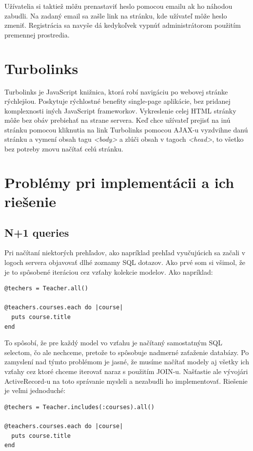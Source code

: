 Užívatelia si taktiež môžu prenastaviť heslo pomocou emailu ak ho náhodou zabudli. Na zadaný email sa zašle link na stránku, kde užívateľ môže heslo zmeniť. Registrácia sa navyše dá kedykoľvek vypnúť administrátorom použitím premennej prostredia.

\clearpage
\section{Turbolinks}

Turbolinks je JavaScript knižnica, ktorá robí navigáciu po webovej stránke rýchlejšou. Poskytuje rýchlostné benefity single-page aplikácie, bez pridanej komplexnosti iných JavaScript frameworkov. Vykreslenie celej HTML stránky môže bez obáv prebiehať na strane servera. Keď chce užívateľ prejisť na inú stránku pomocou kliknutia na link Turbolinks pomocou AJAX-u vyzdvihne danú stránku a vymení obsah tagu \emph{<body>} a zlúči obsah v tagoch \emph{<head>}, to všetko bez potreby znovu načítať celú stránku. \citep{web:turbolinks}

\section{Problémy pri implementácii a ich riešenie}
\subsection{N+1 queries}

Pri načítaní niektorých prehľadov, ako napríklad prehľad vyučujúcich sa začali v logoch servera objavovať dlhé zoznamy SQL dotazov. Ako prvé som si všimol, že je to spôsobené iteráciou cez vzťahy kolekcie modelov. Ako napríklad:

\begin{verbatim}
@techers = Teacher.all()

@teachers.courses.each do |course|
  puts course.title
end
\end{verbatim}

To spôsobí, že pre každý model vo vzťahu je načítaný samostatným SQL selectom, čo ale nechceme, pretože to spôsobuje nadmerné zaťaženie databázy. Po zamyslení nad týmto problémom je jasné, že musíme načítať modely aj všetky ich vzťahy cez ktoré chceme iterovať naraz s použitím JOIN-u.
Našťastie ale vývojári ActiveRecord-u na toto správanie mysleli a nezabudli ho implementovať. Riešenie je veľmi jednoduché:

\begin{verbatim}
@techers = Teacher.includes(:courses).all()

@teachers.courses.each do |course|
  puts course.title
end
\end{verbatim}

